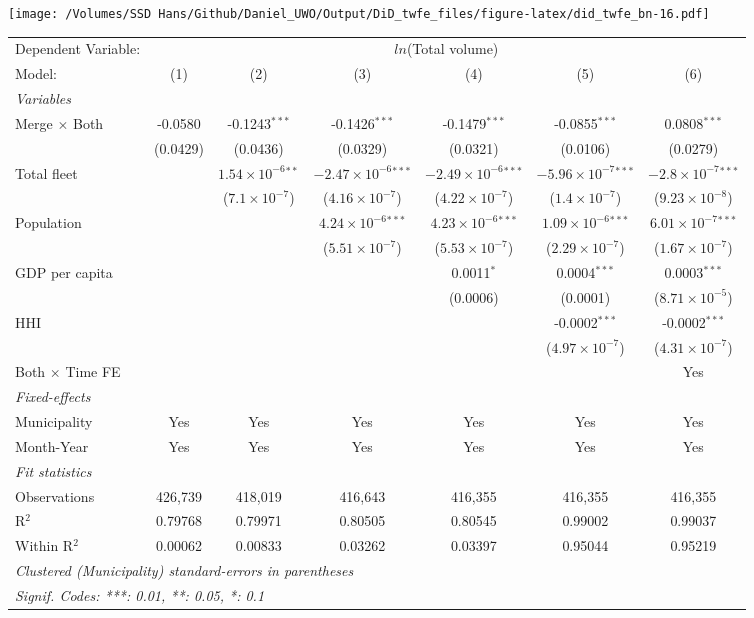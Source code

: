 \documentclass[
]{article}
\begin{document}
\texttt{[image: /Volumes/SSD Hans/Github/Daniel\_UWO/Output/DiD\_twfe\_files/figure-latex/did\_twfe\_bn-16.pdf]}

\begin{tabular}{lcccccc}
\tabularnewline\midrule\midrule
Dependent Variable:&\multicolumn{6}{c}{$ln$(Total volume)}\\
Model:&(1) & (2) & (3) & (4) & (5) & (6)\\
\midrule \emph{Variables}&   &   &   &   &   &  \\
Merge $\times $ Both & -0.0580 & -0.1243$^{***}$ & -0.1426$^{***}$ & -0.1479$^{***}$ & -0.0855$^{***}$ & 0.0808$^{***}$\\
  &(0.0429) & (0.0436) & (0.0329) & (0.0321) & (0.0106) & (0.0279)\\
Total fleet &    & $1.54\times 10^{-6}$$^{**}$ & $-2.47\times 10^{-6}$$^{***}$ & $-2.49\times 10^{-6}$$^{***}$ & $-5.96\times 10^{-7}$$^{***}$ & $-2.8\times 10^{-7}$$^{***}$\\
  &   & ($7.1\times 10^{-7}$) & ($4.16\times 10^{-7}$) & ($4.22\times 10^{-7}$) & ($1.4\times 10^{-7}$) & ($9.23\times 10^{-8}$)\\
Population &    &    & $4.24\times 10^{-6}$$^{***}$ & $4.23\times 10^{-6}$$^{***}$ & $1.09\times 10^{-6}$$^{***}$ & $6.01\times 10^{-7}$$^{***}$\\
  &   &    & ($5.51\times 10^{-7}$) & ($5.53\times 10^{-7}$) & ($2.29\times 10^{-7}$) & ($1.67\times 10^{-7}$)\\
GDP per capita &    &    &    & 0.0011$^{*}$ & 0.0004$^{***}$ & 0.0003$^{***}$\\
  &   &    &    & (0.0006) & (0.0001) & ($8.71\times 10^{-5}$)\\
HHI &    &    &    &    & -0.0002$^{***}$ & -0.0002$^{***}$\\
  &   &    &    &    & ($4.97\times 10^{-7}$) & ($4.31\times 10^{-7}$)\\
Both $\times$ Time FE &  &  &  &  &  & Yes\\
\midrule \emph{Fixed-effects}&   &   &   &   &   &  \\
Municipality & Yes & Yes & Yes & Yes & Yes & Yes\\
Month-Year & Yes & Yes & Yes & Yes & Yes & Yes\\
\midrule \emph{Fit statistics}&  & & & & & \\
Observations & 426,739&418,019&416,643&416,355&416,355&416,355\\
R$^2$ & 0.79768&0.79971&0.80505&0.80545&0.99002&0.99037\\
Within R$^2$ & 0.00062&0.00833&0.03262&0.03397&0.95044&0.95219\\
\midrule\midrule\multicolumn{7}{l}{\emph{Clustered (Municipality) standard-errors in parentheses}}\\
\multicolumn{7}{l}{\emph{Signif. Codes: ***: 0.01, **: 0.05, *: 0.1}}\\
\end{tabular}
\end{document}
